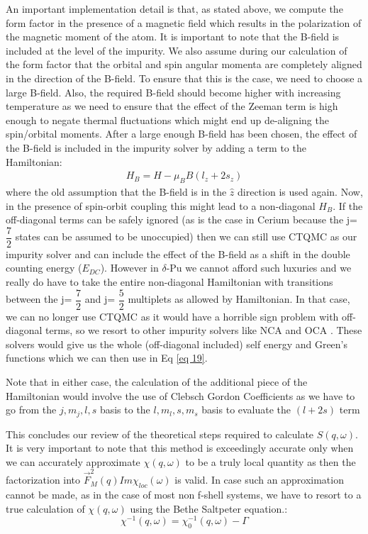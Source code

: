 \documentclass[10pt]{ruthesis}
\begin{document}
{An important implementation detail is that, as stated above, we compute the form factor in the presence of a magnetic field which results in the polarization of the magnetic moment of the atom. It is important to note that the B-field is included at the level of the impurity. We also assume during our calculation of the form factor that the orbital and spin angular momenta are completely aligned in the direction of the B-field. To ensure that this is the case, we need to choose a large B-field. Also, the required B-field should become higher with increasing temperature as we need to ensure that the effect of the Zeeman term is high enough to negate thermal fluctuations which might end up de-aligning the spin/orbital moments.
After a large enough B-field has been chosen, the effect of the B-field is included in the impurity solver by adding a term to the Hamiltonian:
\begin{align}
H_{B}=H-\mu_{B}B(l_{z}+2s_{z})
\end{align} 
where the old assumption that the B-field is in the $\hat{z}$ direction is used again. Now, in the presence of spin-orbit coupling this might lead to a non-diagonal $H_{B}$. If the off-diagonal terms can be safely ignored (as is the case in Cerium because the j= $\dfrac{7}{2}$ states can be assumed to be unoccupied) then we can still use CTQMC as our impurity solver and can include the effect of the B-field as a shift in the double counting energy ($E_{DC}$). However in $\delta$-Pu we cannot afford such luxuries and we really do have to take the entire non-diagonal Hamiltonian with transitions between the  j= $\dfrac{7}{2}$ and  j= $\dfrac{5}{2}$ multiplets as allowed by Hamiltonian. In that case, we can no longer use CTQMC as it would have a horrible sign problem with off-diagonal terms, so we resort to other impurity solvers like NCA and OCA \cite{Chuck_prb}. These solvers would give us the whole (off-diagonal included) self energy and Green's functions which we can then use in Eq \ref{eq 19}.

Note that in either case, the calculation of the additional piece of the Hamiltonian would involve the use of Clebsch Gordon Coefficients as we have to go from the $j,m_{j}, l,s$ basis to the $l,m_{l},s,m_{s}$ basis to evaluate the $(l+2s)$ term 

This concludes our review of the theoretical steps required to calculate $S(q,\omega)$. It is very important to note that this method is exceedingly accurate only when we can accurately approximate $\chi(q,\omega)$ to be a truly local quantity as then the factorization into $\vec{F}_M^2(q) Im \chi_{loc}(\omega)$ is valid. In case such an approximation cannot be made, as in the case of most non f-shell systems, we have to resort to a true calculation of $\chi(q,\omega)$ using the Bethe Saltpeter equation.:
\begin{equation}
 \chi^{-1}(q,\omega)= \chi_0^{-1}(q,\omega) - \Gamma
 \end{equation}
 
}
\end{document}
